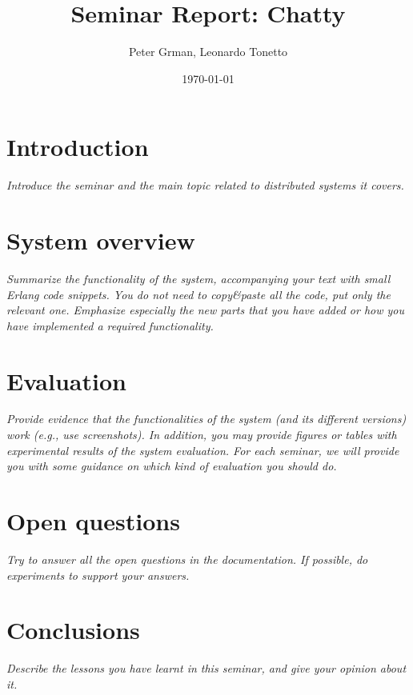 \documentclass[a4paper, 11pt]{article}
\title{Seminar Report: Chatty}
\author{Peter Grman, Leonardo Tonetto}
\date{\today{}}
\begin{document}
\maketitle

\section{Introduction}

\textit{Introduce the seminar and the main topic related to distributed systems it covers.}

\section{System overview}

\textit{Summarize the functionality of the system, accompanying your text with small Erlang code snippets. You do not need to copy\&paste all the code, put only the relevant one. Emphasize especially the new parts that you have added or how you have implemented a required functionality.}

\section{Evaluation}

\textit{Provide evidence that the functionalities of the system (and its different versions) work (e.g., use screenshots). In addition, you may provide figures or tables with experimental results of the system evaluation. For each seminar, we will provide you with some guidance on which kind of evaluation you should do.}

\section{Open questions}

\textit{Try to answer all the open questions in the documentation. If possible, do experiments to support your answers.}

\section{Conclusions}

\textit{Describe the lessons you have learnt in this seminar, and give your opinion about it.}
\end{document}
